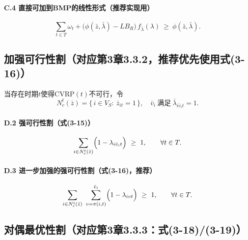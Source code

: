 \documentclass{article}
\begin{document}
\paragraph{C.4 直接可加到BMP的线性形式（推荐实现用）}
\begin{equation}
\sum_{t\in T}\omega_t
+
\bigl(\phi(\bar z,\bar\lambda)-LB_R\bigr)\,f_{\bar\lambda}(\lambda)
\ \ge\
\phi(\bar z,\bar\lambda).
\label{eq:opt_g_linear}
\end{equation}

\subsection{加强可行性割（对应第3章3.3.2，推荐优先使用式(3-16)）}

当存在时期$t$使得CVRP$(t)$不可行，令
\[
N_c^t(\bar z)=\{\,i\in V_S:\ \bar z_{it}=1\,\},
\quad
\bar v_i\ \text{满足}\ \bar\lambda_{i\bar v_i t}=1.
\]



\paragraph{D.2 强可行性割（式(3-15)）}
\begin{equation}
\sum_{i\in N_c^t(\bar z)}\Bigl(1-\lambda_{i\bar v_i t}\Bigr)\ \ge\ 1,
\qquad \forall t\in T.
\label{eq:feas_315}
\end{equation}

\paragraph{D.3 进一步加强的强可行性割（式(3-16)，推荐）}
\begin{equation}
\sum_{i\in N_c^t(\bar z)}\ \sum_{v=\pi(i,t)}^{\bar v_i}\Bigl(1-\lambda_{ivt}\Bigr)\ \ge\ 1,
\qquad \forall t\in T.
\label{eq:feas_316}
\end{equation}

\subsection{对偶最优性割（对应第3章3.3.3：式(3-18)/(3-19)）}
\end{document}
